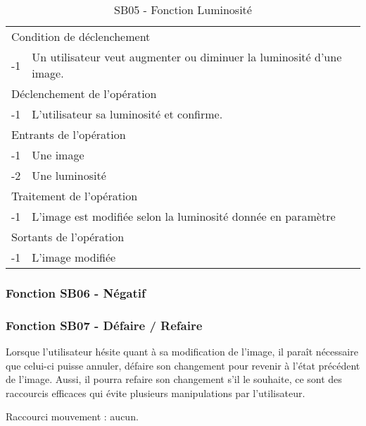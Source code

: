 \documentclass[a4paper]{article}
\begin{document}
\begin{table}[H]
  \centering
   \small
	\begin{tabular}{|c|p{12cm}|}
   		\hline
   			\rowcolor{lightgray}\multicolumn{2}{|c|}{\textbf{SB05 - Fonction Luminosité}} \\
   		\hline
   			\multicolumn{2}{|l|}{Condition de d\'eclenchement} \\
   		\hline
   			-1 & Un utilisateur veut augmenter ou diminuer la luminosité d'une image. \\
   		\hline
   			\multicolumn{2}{|l|}{D\'eclenchement de l'op\'eration} \\
   		\hline
   			-1 & L'utilisateur sa luminosité et confirme. \\
   		\hline
   			\multicolumn{2}{|l|}{Entrants de l'op\'eration} \\
   		\hline
        	-1 & Une image \\
   			-2 & Une luminosité \\ 	
        \hline
   			\multicolumn{2}{|l|}{Traitement de l'op\'eration} \\
  		\hline
   			-1 & L'image est modifiée selon la luminosité donnée en paramètre \\
   		\hline
   			\multicolumn{2}{|l|}{Sortants de l'op\'eration} \\
   		\hline
   			-1 & L'image modifiée \\
   		\hline
	\end{tabular}
  \caption{SB05 - Fonction Luminosité}
  \normalsize
  \label{tab:visu_img_luminosite}
\end{table}


\subsubsection{Fonction SB06 - Négatif}


\subsubsection{Fonction SB07 - Défaire / Refaire}

Lorsque l'utilisateur hésite quant à sa modification de l'image, il paraît nécessaire que celui-ci puisse annuler, défaire son changement pour revenir à l'état précédent de l'image. Aussi, il pourra refaire son changement s'il le souhaite, ce sont des raccourcis efficaces qui évite plusieurs manipulations par l'utilisateur.

Raccourci mouvement : aucun.
\end{document}
